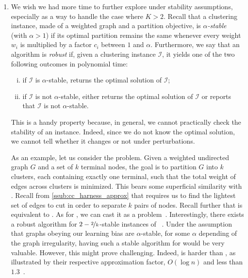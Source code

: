 \begin{enumerate}[1)]
	\item We wish we had more time to further explore \pcc{} under stability assumptions, especially
		as a way to handle the case where $K>2$. Recall that a clustering instance, made of a weighted
		graph and a partition objective, is \emph{$\alpha$-stable} (with $\alpha>1$) if its optimal
		partition remains the same whenever every weight $w_i$ is multiplied by a factor $c_i$ between
		$1$ and $\alpha$. Furthermore, we say that an algorithm is \emph{robust} if, given a clustering
		instance $\mathcal{I}$, it yields one of the two following outcomes in polynomial time:
		\begin{enumerate}[(i),nosep]
			\item if $\mathcal{I}$ is $\alpha$-stable, returns the optimal solution of $\mathcal{I}$;
			\item if $\mathcal{I}$ is not $\alpha$-stable, either returns the optimal solution of
				$\mathcal{I}$ or reports that $\mathcal{I}$ is not $\alpha$-stable.
		\end{enumerate}
		This is a handy property because, in general, we cannot practically check the stability of an
		instance. Indeed, since we do not know the optimal solution, we cannot tell whether it changes
		or not under perturbations.

		As an example, let us consider the \minmc{} problem. Given a weighted undirected graph $G$ and a
		set of $k$ terminal nodes, the goal is to partition $G$ into $k$ clusters, each containing
		exactly one terminal, such that the total weight of edges across clusters is minimized. This
		bears some superficial similarity with \mmc{}. Recall from \autoref{ssub:cc_harness_approx} that
		\mmc{} requires us to find the lightest set of edges to cut in order to separate $k$ pairs of
		nodes.  Recall further that \mmc{} is equivalent to \pcc{}. As for \minmc{}, we can cast it as a
		\pcc{} problem~\autocite[Theorem 24]{Bansal2004}. Interestingly, there exists a robust
		algorithm for $2-\nicefrac{2}{k}$-stable instances of \minmc{}~\autocite{StableCC17}.  Under the
		assumption that graphs obeying our learning bias are $\alpha$-stable, for some $\alpha$
		depending of the graph irregularity, having such a stable algorithm for \mmc{} would be very
		valuable.  However, this might prove challenging. Indeed, \mmc{} is harder than \minmc{}, as
		illustrated by their respective approximation factor, $O(\log n)$ and less than
		$1.3$~\autocite{minmcApprox17}.

\end{enumerate}
